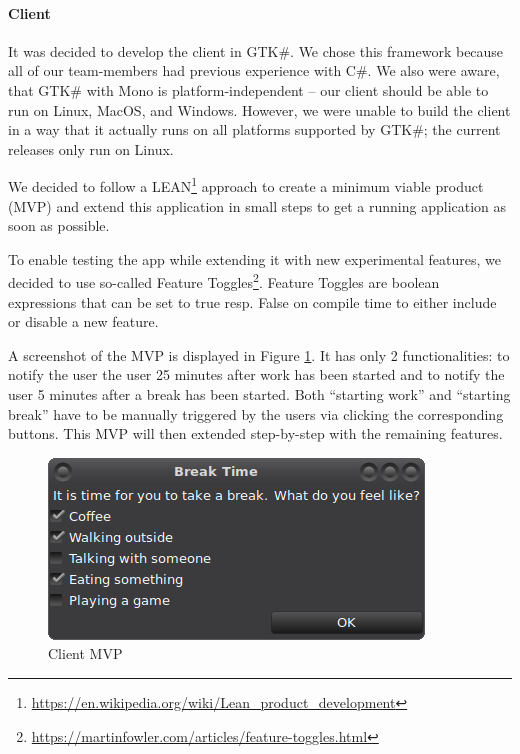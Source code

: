 

\paragraph{Client} It was decided to develop the client in GTK\#. We chose this framework because all of our 
team-members had previous experience with C\#. We also were aware, that GTK\# with Mono is platform-independent -- our 
client should be able to run on Linux, MacOS, and Windows. However, we were unable to build the client in a way that 
it actually runs on all platforms supported by GTK\#; the current releases only run on Linux.

We decided to follow a LEAN\footnote{\url{https://en.wikipedia.org/wiki/Lean_product_development}} approach to create 
a minimum viable product (MVP) and extend this application in small steps to get a running application as soon as 
possible.


To enable testing the app while extending it with new experimental features, we decided to use so-called Feature Toggles\footnote{\url{https://martinfowler.com/articles/feature-toggles.html}}. Feature Toggles are boolean expressions that can be set to true resp. False on compile time to either include or disable a new feature.

A screenshot of the MVP is displayed in Figure \ref{fig:mvp-screenshot}. It has only 2 functionalities: to notify the 
user the user 25 minutes after work has been started and to notify the user 5 minutes after a break has been started. 
Both ``starting work'' and ``starting break'' have to be manually triggered by the users via clicking the 
corresponding buttons. This MVP will then extended step-by-step with the remaining features.

\begin{figure}
  \centering
  \includegraphics{images/mvp-screenshot.png}
  \caption{Client MVP}
  \label{fig:mvp-screenshot}
\end{figure}

